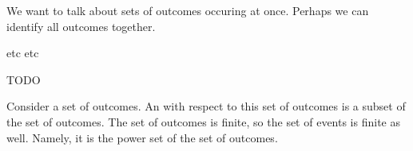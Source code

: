 
\sbasic






\sstart
{}


We want to talk about sets
of outcomes occuring at once.
Perhaps we can identify all outcomes together.

etc etc

TODO


Consider a set of outcomes.
An  with respect
to this set of outcomes is a
subset of the set of outcomes.
The set of outcomes is finite,
so the set of events is
finite as well. Namely, it
is the power set of the set
of outcomes.
\strats
